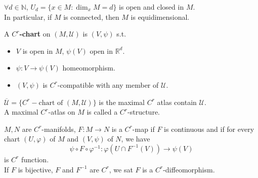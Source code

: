 \begin{proposition}
     $ \forall d\in \mathbb{N} $,  $ U_d=\{x\in M:\dim_x M=d\} $ is  open and closed in  $ M $.\\
     In particular, if  $ M  $ is connected, then  $ M  $ is equidimensional.  
\end{proposition}
\begin{definition}
    A \textbf{$ C^r $-chart } on  $ (M,\mathcal{U}) $ is  $ (V,\psi) $ s.t.
    \begin{itemize}
        \item  $ V  $ is open in  $ M  $,  $ \psi(V ) $ open in  $ \mathbb{R}^d $.
        \item  $ \psi:V\rightarrow \psi(V) $ homeomorphism.
        \item  $ (V,\psi) $ is  $ C^r $-compatible with any member of  $ \mathcal{U} $.   
    \end{itemize} 
     $ \overline{\mathcal{U}}=\{C^r-\text{chart of }(M,\mathcal{U})\} $ is the maximal  $ C^r  $ atlas contain  $ \mathcal{U} $.\\
     A maximal  $ C^r $-atlas on  $ M  $ is called a  $ C^r  $-structure.\\  
\end{definition}
\begin{definition}
     $ M,N  $ are  $ C^r  $-manifolds,  $ F:M\rightarrow N $ is a  $ C^r $-map if  $ F  $ is continuous and if for every chart  $ (U,\varphi) $ of  $ M  $ and  $ (V,\psi) $ of  $ N  $, we have 
     \[\psi\circ F\circ\varphi^{-1}:\varphi(U\cap F^{-1}(V))\rightarrow \psi(V)\] is  $ C^r  $ function.\\
     If  $ F  $ is bijective,  $ F $ and  $ F^{-1}  $ are  $ C^r $, we sat  $ F  $ is a  $ C^r $-diffeomorphism.
\end{definition}

